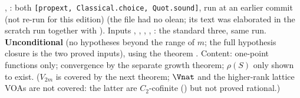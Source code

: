 \begin{status}
, : both
\texttt{[propext, Classical.choice, Quot.sound]}, run at an earlier commit (not re-run for this edition) (the file had no olean; its text was elaborated
in the scratch run together with ). Inputs ,
, , ,
: the standard three, same run. \textbf{Unconditional} (no hypotheses beyond the range
of $m$; the full hypothesis closure is the two proved inputs), using the theorem . Content: one-point
functions only; convergence by the separate growth theorem; $\rho(S)$ only shown to exist. ($V_{2m}$ is covered by the next
theorem; $\Vnat$ and the higher-rank lattice VOAs are not covered: the latter are $C_2$-cofinite
() but not proved rational.)
\end{status}

